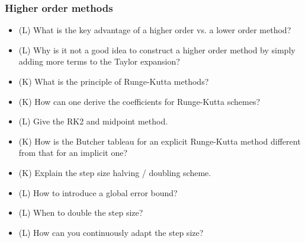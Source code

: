 \subsubsection*{Higher order methods}
\begin{itemize}
    \item (L) What is the key advantage of a higher order vs. a lower order method?
    \answerboxS
    \item (L) Why is it not a good idea to construct a higher order method by simply adding more terms to the Taylor expansion?
    \answerboxS
    \item (K) What is the principle of Runge-Kutta methods?
    \answerboxM
    \item (K) How can one derive the coefficients for Runge-Kutta schemes?
    \answerboxM
    \item (L) Give the RK2 and midpoint method.
    \answerboxM
    \item (K) How is the Butcher tableau for an explicit Runge-Kutta method different from that for an implicit one?
    \answerboxM
    \item (K) Explain the step size halving / doubling scheme.
    \answerboxM
    \item (L) How to introduce a global error bound?
    \answerboxS
    \item (L) When to double the step size?
    \answerboxM
    \item (L) How can you continuously adapt the step size?
    \answerboxM
\end{itemize}

